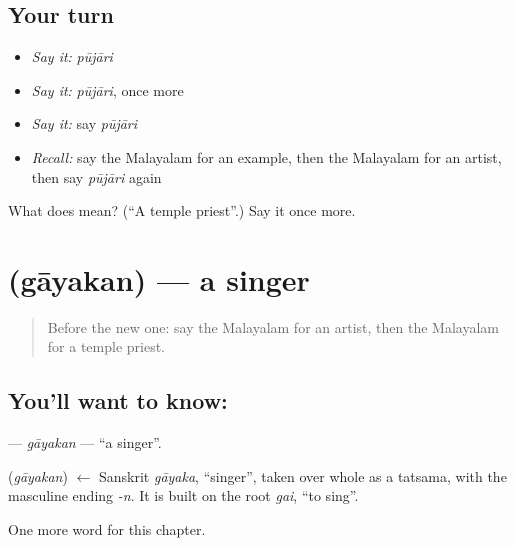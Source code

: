\subsection*{Your turn}
\begin{itemize}
\raggedright
  \item \emph{Say it:} \emph{pūjāri}
  \item \emph{Say it:} \emph{pūjāri}, once more
  \item \emph{Say it:} say \emph{pūjāri}
  \item \emph{Recall:} say the Malayalam for an example, then the Malayalam for an artist, then say \emph{pūjāri} again
\end{itemize}

\begin{tcolorbox}[breakable,colback=teal!4,colframe=teal!35!black,title={Before you move on}]
What does  mean? (\textquotedblleft{}A temple priest\textquotedblright{}.) Say it once more.
\end{tcolorbox}
\section[\texorpdfstring{\ml{ഗായകൻ} (gāyakan)}{ഗായകൻ (gāyakan)}]{ (gāyakan) — a singer}

\label{lesson:ML-C262-gayakan}



\begin{quote}
Before the new one: say the Malayalam for an artist, then the Malayalam for a temple priest.
\end{quote}

\subsection*{You'll want to know: }
\textbf{} — \emph{gāyakan} — \textquotedblleft{}a singer\textquotedblright{}.

\begin{cousinweb}
\textbf{} (\emph{gāyakan}) $\leftarrow$ Sanskrit \emph{gāyaka}, \textquotedblleft{}singer\textquotedblright{}, taken over whole as a tatsama, with the masculine ending \emph{-n}. It is built on the root \emph{gai}, \textquotedblleft{}to sing\textquotedblright{}.
\end{cousinweb}

\begin{grammarlens}[title={What you've built}]
One more word for this chapter.
\end{grammarlens}

